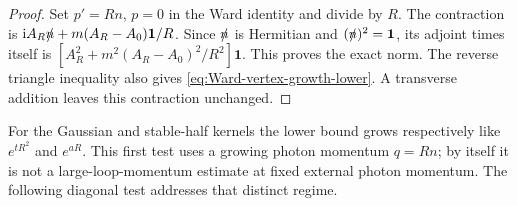 \documentclass[final,5p,times,twocolumn,numbers,nopreprintline]{elsarticle}
\numberwithin{equation}{section}
\theoremstyle{definition}
\theoremstyle{remark}
\newcommand{\ii}{\mathrm i}
\newcommand{\one}{\mathbf 1}
\begin{document}
\begin{proof}
Set \(p'=Rn\), \(p=0\) in the Ward identity and divide by
\(R\). The contraction is
\(\ii A_R\slashed n+m(A_R-A_0)\one/R\).
Since \(\slashed n\) is Hermitian and \((\slashed n)^2=\one\),
its adjoint times itself is
\([A_R^2+m^2(A_R-A_0)^2/R^2]\one\). This proves the exact
norm. The reverse triangle inequality also gives
\eqref{eq:Ward-vertex-growth-lower}. A transverse addition leaves
this contraction unchanged.
\end{proof}

For the Gaussian and stable-half kernels the lower bound grows
respectively like \(e^{tR^2}\) and \(e^{aR}\). This first test
uses a growing photon momentum \(q=Rn\); by itself it is not a
large-loop-momentum estimate at fixed external photon momentum.
The following diagonal test addresses that distinct regime.
\end{document}
